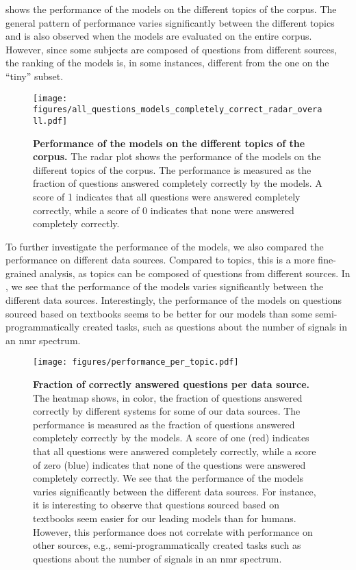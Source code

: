  shows the performance of the models on the different topics of the \chembench corpus.
The general pattern of performance varies significantly between the different topics and is also observed when the models are evaluated on the entire corpus. 
However, since some subjects are composed of questions from different sources, the ranking of the models is, in some instances, different from the one on the \enquote{tiny} subset.

\begin{figure}[htb]
    \centering
    \texttt{[image: figures/all\_questions\_models\_completely\_correct\_radar\_overall.pdf]}
    \caption{\textbf{Performance of the models on the different topics of the \chembench corpus.} The radar plot shows the performance of the models on the different topics of the \chembench corpus. The performance is measured as the fraction of questions answered completely correctly by the models.
    A score of 1 indicates that all questions were answered completely correctly, while a score of 0 indicates that none were answered completely correctly.
    }
    \label{fig:all_questions_models_completely_correct_radar_overall}
\end{figure}


To further investigate the performance of the models, we also compared the performance on different data sources.
Compared to topics, this is a more fine-grained analysis, as topics can be composed of questions from different sources.
In , we see that the performance of the models varies significantly between the different data sources.
Interestingly, the performance of the models on questions sourced based on textbooks seems to be better for our models than some semi-programmatically created tasks, such as questions about the number of signals in an \gls{nmr} spectrum.


\begin{figure}[htb]
    \centering
    \texttt{[image: figures/performance\_per\_topic.pdf]}
    \caption{\textbf{Fraction of correctly answered questions per data source.} The heatmap shows, in color, the fraction of questions answered correctly by different systems for some of our data sources. The performance is measured as the fraction of questions answered completely correctly by the models. A score of one (red) indicates that all questions were answered completely correctly, while a score of zero (blue) indicates that none of the questions were answered completely correctly.
        We see that the performance of the models varies significantly between the different data sources. For instance, it is interesting to observe that questions sourced based on textbooks seem easier for our leading models than for humans. However, this performance does not correlate with performance on other sources, e.g., semi-programmatically created tasks such as questions about the number of signals in an \gls{nmr} spectrum.
    }
    \label{fig:performance_per_topic}
\end{figure}

